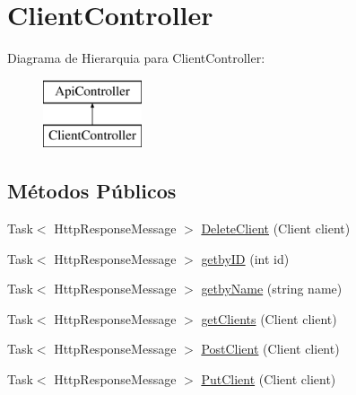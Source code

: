 \hypertarget{classApi3Layers_1_1Controllers_1_1ClientController}{}\section{Client\+Controller}
\label{classApi3Layers_1_1Controllers_1_1ClientController}
Diagrama de Hierarquia para Client\+Controller\+:\begin{figure}[H]
\begin{center}
\leavevmode
\includegraphics[height=2.000000cm]{d6/d89/classApi3Layers_1_1Controllers_1_1ClientController}
\end{center}
\end{figure}
\subsection*{Métodos Públicos}
\begin{DoxyCompactItemize}
\item 
Task$<$ Http\+Response\+Message $>$ \hyperlink{classApi3Layers_1_1Controllers_1_1ClientController_a9313f9369acc70d20109a5e2621486fd}{Delete\+Client} (Client client)
\item 
Task$<$ Http\+Response\+Message $>$ \hyperlink{classApi3Layers_1_1Controllers_1_1ClientController_a63543b21b5d71a250f5c2e251e1725eb}{getby\+ID} (int id)
\item 
Task$<$ Http\+Response\+Message $>$ \hyperlink{classApi3Layers_1_1Controllers_1_1ClientController_a6d76d1f7034cfdf7e36f0b2f47c61019}{getby\+Name} (string name)
\item 
Task$<$ Http\+Response\+Message $>$ \hyperlink{classApi3Layers_1_1Controllers_1_1ClientController_acd6322615b0779aafdbef5f44517f329}{get\+Clients} (Client client)
\item 
Task$<$ Http\+Response\+Message $>$ \hyperlink{classApi3Layers_1_1Controllers_1_1ClientController_a05f7ee98b8ff74ab142860e21b1f8350}{Post\+Client} (Client client)
\item 
Task$<$ Http\+Response\+Message $>$ \hyperlink{classApi3Layers_1_1Controllers_1_1ClientController_ad9896ffbab1cde391410a4685f44f0f6}{Put\+Client} (Client client)
\end{DoxyCompactItemize}
